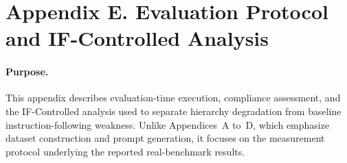 \documentclass{article}
\begin{document}
%

\clearpage
\section*{Appendix E. Evaluation Protocol and IF-Controlled Analysis}

\paragraph{Purpose.}
This appendix describes evaluation-time execution, compliance assessment, and the IF-Controlled analysis used to separate hierarchy degradation from baseline instruction-following weakness.
Unlike Appendices~A to~D, which emphasize dataset construction and prompt generation, it focuses on the measurement protocol underlying the reported real-benchmark results.
\end{document}
